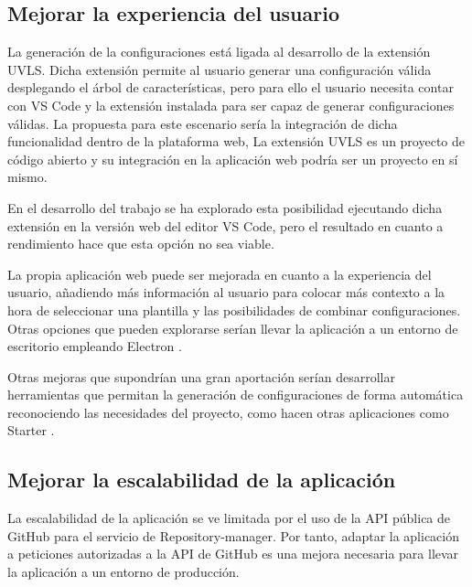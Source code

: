 \documentclass[12pt, a4paper, twoside]{article}
\begin{document}
\subsection{Mejorar la experiencia del usuario }
La generación de la configuraciones está ligada al desarrollo de la extensión UVLS. Dicha extensión permite al usuario generar una configuración válida desplegando el árbol de características, pero para ello el usuario
necesita contar con VS Code y la extensión instalada para ser capaz de generar configuraciones válidas. La propuesta para este escenario sería la integración de dicha funcionalidad dentro de la plataforma web,
La extensión UVLS es un proyecto de código abierto y su integración en la aplicación web podría ser un proyecto en sí mismo. 

En el desarrollo del trabajo se ha explorado esta posibilidad ejecutando dicha extensión en la versión web del editor VS Code, pero el resultado en cuanto a rendimiento hace que esta opción no sea viable.

La propia aplicación web puede ser mejorada en cuanto a la experiencia del usuario, añadiendo más información al usuario para colocar más contexto a la hora de seleccionar una plantilla y las posibilidades de combinar configuraciones. 
Otras opciones que pueden explorarse serían llevar la aplicación a un entorno de escritorio empleando Electron \cite{electron}.

Otras mejoras que supondrían una gran aportación serían desarrollar herramientas que permitan la generación de configuraciones de forma automática reconociendo las necesidades del proyecto, como hacen otras aplicaciones como Starter \cite{starter}.

\subsection{Mejorar la escalabilidad de la aplicación}
La escalabilidad de la aplicación se ve limitada por el uso de la API pública de GitHub para el servicio de Repository-manager.
Por tanto, adaptar la aplicación a peticiones autorizadas a la API de GitHub es una mejora necesaria para llevar la aplicación a un entorno de producción.
\end{document}
